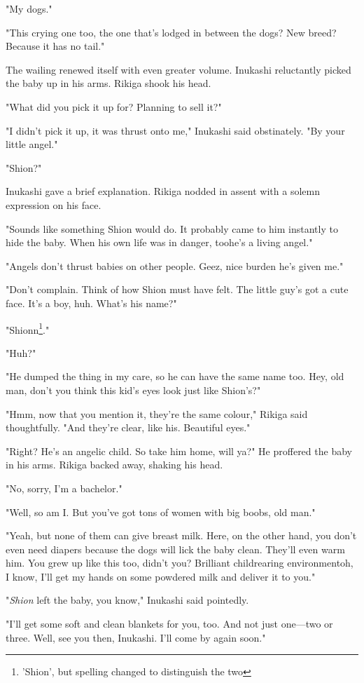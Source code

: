 "My dogs."

"This crying one too, the one that's lodged in between the dogs? New
breed? Because it has no tail."

The wailing renewed itself with even greater volume. Inukashi
reluctantly picked the baby up in his arms. Rikiga shook his head.

"What did you pick it up for? Planning to sell it?"

"I didn't pick it up, it was thrust onto me," Inukashi said obstinately.
"By your little angel."

"Shion?"

Inukashi gave a brief explanation. Rikiga nodded in assent with a solemn
expression on his face.

"Sounds like something Shion would do. It probably came to him instantly
to hide the baby. When his own life was in danger, too\el he's a living
angel."

"Angels don't thrust babies on other people. Geez, nice burden he's
given me."

"Don't complain. Think of how Shion must have felt. The little guy's got
a cute face. It's a boy, huh. What's his name?"

"Shionn\footnote{'Shion', but spelling changed to distinguish the two}."

"Huh?"

"He dumped the thing in my care, so he can have the same name too. Hey,
old man, don't you think this kid's eyes look just like Shion's?"

"Hmm, now that you mention it, they're the same colour," Rikiga said
thoughtfully. "And they're clear, like his. Beautiful eyes."

"Right? He's an angelic child. So take him home, will ya?" He proffered
the baby in his arms. Rikiga backed away, shaking his head.

"No, sorry, I'm a bachelor."

"Well, so am I. But you've got tons of women with big boobs, old man."

"Yeah, but none of them can give breast milk. Here, on the other hand,
you don't even need diapers because the dogs will lick the baby clean.
They'll even warm him. You grew up like this too, didn't you? Brilliant
childrearing environment\el oh, I know, I'll get my hands on some
powdered milk and deliver it to you."

"\emph{Shion} left the baby, you know," Inukashi said pointedly.

"I'll get some soft and clean blankets for you, too. And not just
one---two or three. Well, see you then, Inukashi. I'll come by again
soon."

